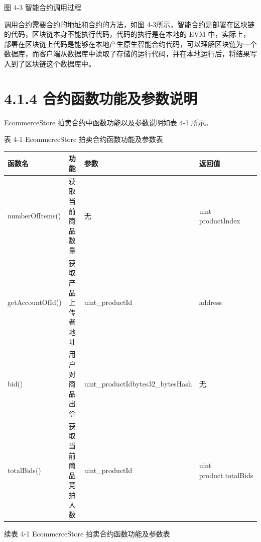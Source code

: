 \documentclass[
  10
]{article}
\newcounter{none} %
\begin{document}
图 4-3 智能合约调用过程

调用合约需要合约的地址和合约的方法，如图
4-3所示，智能合约是部署在区块链的代码，区块链本身不能执行代码，代码的执行是在本地的
EVM
中，实际上，部署在区块链上代码是能够在本地产生原生智能合约代码，可以理解区块链为一个数据库，而客户端从数据库中读取了存储的运行代码，并在本地运行后，将结果写入到了区块链这个数据库中。

\section{4.1.4
合约函数功能及参数说明}\label{ux5408ux7ea6ux51fdux6570ux529fux80fdux53caux53c2ux6570ux8bf4ux660e}

EcommerceStore 拍卖合约中函数功能以及参数说明如表 4-1 所示。

表 4-1 EcommerceStore 拍卖合约函数功能及参数表

{\def\LTcaptype{none} %
\begin{longtable}[]{@{}|l|l|l|l|@{}}
\toprule\noalign{}
\endhead
\bottomrule\noalign{}
\endlastfoot
\hline
函数名 & 功能 & 参数 & 返回值 \\
\hline
numberOfItems() & 获取当前商品数量 & 无 & uint productIndex \\
\hline
getAccountOfId() & 获取产品上传者地址 & uint\_productId & address \\
\hline
bid() & 用户对商品出价 & uint\_productIdbytes32\_bytesHash & 无 \\
\hline
totalBids() & 获取当前商品竞拍人数 & uint\_productId & uint
product.totalBids \\
\hline
\end{longtable}
}

续表 4-1 EcommerceStore 拍卖合约函数功能及参数表
\end{document}
